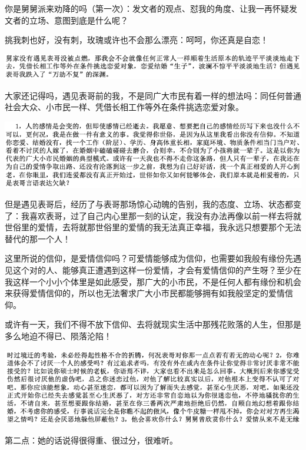 \documentclass[9pt, b5paper]{article}
\begin{document}
你是舅舅派来劝降的吗（第一次）：发文者的观点、怼我的角度、让我一再怀疑发文者的立场、意图到底是什么呢？

挑我刺也好，没有刺，玫瑰或许也不会那么漂亮：呵呵，你还真是自恋！

\begin{center}
\includegraphics[width=.9\linewidth]{./pic/p1p70.png}
\end{center}

大家还记得吗，遇见表哥前的我，不是同广大市民有着一样的想法吗：同任何普通社会大众、小市民一样、凭借长相工作等外在条件挑选恋爱对象。

\begin{center}
\includegraphics[width=.9\linewidth]{./pic/p1p114-2.png}
\end{center}

但是遇见表哥后，经历了与表哥那场惊心动魄的告别，我的态度、立场、状态都变了：我喜欢表哥，过了自己内心里那一刻的认定，我没有办法再像以前一样去将就世俗里的爱情，去将就那世俗里的爱情的我无法真正幸福，我永远只想要那个无法替代的那一个人！

这里所说的信仰，是爱情信仰吗？可爱情能够成为信仰，也需要如我般有缘份先遇见这个对的人、能够真正遭遇到这样一份爱情，才会有爱情信仰的产生呀？至少在我这样一个小小个体里是如此感受，那广大的小市民，不是任何人都有缘份和机会来获得爱情信仰的，所以也无法奢求广大小市民都能够拥有如我般坚定的爱情信仰。

或许有一天，我们不得不放下信仰、去将就现实生活中那残花败落的人生，但那是多么地迫不得已、陨落沦陷！

\begin{center}
\includegraphics[width=.9\linewidth]{./pic/p1p109-2.png}
\end{center}

第二点：她的话说得很得重、很过分，很难听。
\end{document}
